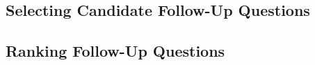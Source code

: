 \subsection{Selecting Candidate Follow-Up Questions}


\subsection{Ranking Follow-Up Questions}

%
%
%
